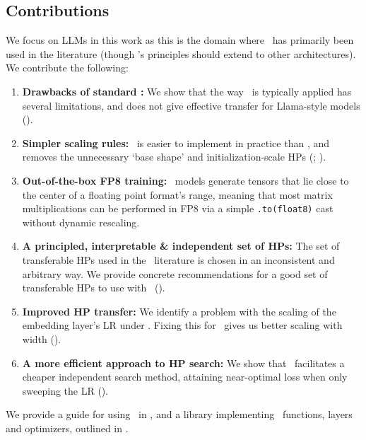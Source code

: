 \subsection{Contributions} \label{sec:introduction:contributions}

We focus on LLMs in this work as this is the domain where \mup\ has primarily been used in the literature (though \umup's principles should extend to other architectures). We contribute the following:

\begin{enumerate}
    \item \textbf{Drawbacks of standard \mup:} We show that the way \mup\ is typically applied has several limitations, and does not give effective transfer for Llama-style models ().

    \item \textbf{Simpler scaling rules:} \umup\ is easier to implement in practice than \mup, and removes the unnecessary `base shape' and initialization-scale HPs (; ).

    \item \textbf{Out-of-the-box FP8 training:} \umup\ models generate tensors that lie close to the center of a floating point format's range, meaning that most matrix multiplications can be performed in FP8 via a simple \texttt{.to(float8)} cast without dynamic rescaling.

    \item \textbf{A principled, interpretable \& independent set of HPs:} The set of transferable HPs used in the \mup\ literature is chosen in an inconsistent and arbitrary way. We provide concrete recommendations for a good set of transferable HPs to use with \umup\ ().

    \item \textbf{Improved HP transfer:} We identify a problem with the scaling of the embedding layer's LR under \mup. Fixing this for \umup\ gives us better scaling with width ().

    \item \textbf{A more efficient approach to HP search:} We show that \umup\ facilitates a cheaper independent search method, attaining near-optimal loss when only sweeping the LR ().
\end{enumerate}

We provide a guide for using \umup\ in , and a library \citep{us_library} implementing \umup\ functions, layers and optimizers, outlined in .
